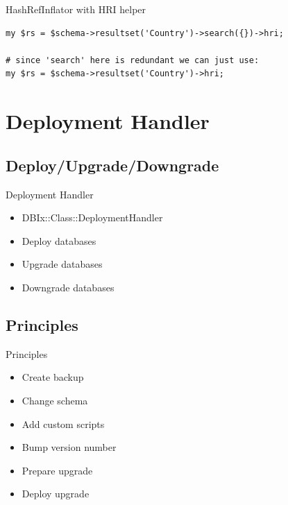 \begin{frame}[fragile]{HashRefInflator with HRI helper}
\begin{lstlisting}
my $rs = $schema->resultset('Country')->search({})->hri;

# since 'search' here is redundant we can just use:
my $rs = $schema->resultset('Country')->hri;
\end{lstlisting}
\end{frame}


\section{Deployment Handler}

\subsection{Deploy/Upgrade/Downgrade}

\begin{frame}{Deployment Handler}
\begin{itemize}
\item DBIx::Class::DeploymentHandler
\item Deploy databases
\item Upgrade databases
\item Downgrade databases
\end{itemize}
\end{frame}

\subsection{Principles}

\begin{frame}{Principles}
\begin{itemize}
\item Create backup
\item Change schema
\item Add custom scripts
\item Bump version number
\item Prepare upgrade
\item Deploy upgrade
\end{itemize}
\end{frame}

